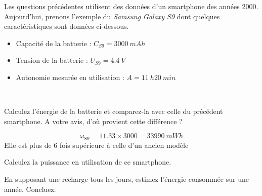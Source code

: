 \documentclass[10pt,fleqn]{article} %
\begin{document}
Les questions précédentes utilisent des données d'un smartphone des années 2000. 
Aujourd'hui, prenons l'exemple du \textit{Samsung Galaxy S9} dont quelques 
caractéristiques sont données ci-dessous. 

\begin{itemize}
  \item Capacité de la batterie : $C_{S9} = \SI{3000}{mAh}$
  \item Tension de la batterie : $U_{S9} = \SI{4.4}{V}$
  \item Autonomie mesurée en utilisation : $A = \SI{11}{h} \SI{20}{min}$
\end{itemize}
\begin{exercise}~
\begin{question}
  Calculez l'énergie de la batterie et comparez-la avec celle du précédent 
  smartphone. A votre avis, d'où provient cette différence ? 
\end{question}
\begin{solution}
  $$\omega_\text{S9} = 11.33 \times 3000 = \SI{33990}{mWh}$$
  Elle est plus de 6 fois supérieure à celle d'un ancien modèle
\end{solution}

\begin{question}
  Calculez la puissance en utilisation de ce smartphone.
\end{question}

\begin{question}
  En supposant une recharge tous les jours, estimez l'énergie consommée sur 
  une année. Concluez. 
\end{question}
\end{exercise}
\end{document}
